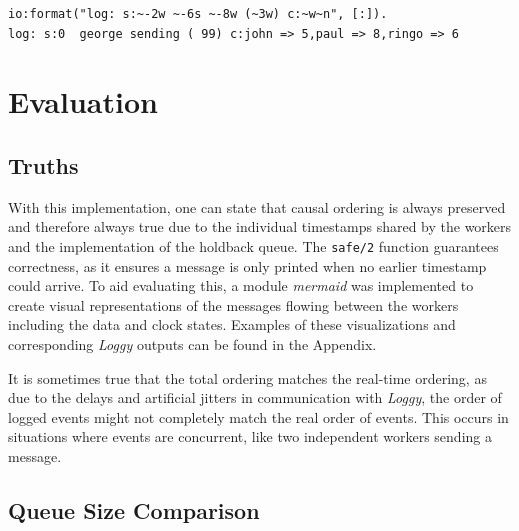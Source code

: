 \documentclass[a4paper, 11pt]{article}
\begin{document}
\begin{verbatim}
io:format("log: s:~-2w ~-6s ~-8w (~3w) c:~w~n", [:]).
log: s:0  george sending ( 99) c:john => 5,paul => 8,ringo => 6
\end{verbatim}

\section{Evaluation}


\subsection{Truths}

With this implementation, one can state that causal ordering is always preserved and therefore always true due to the individual timestamps shared by the workers and the implementation of the holdback queue.
The \texttt{safe/2} function guarantees correctness, as it ensures a message is only printed when no earlier timestamp could arrive. 
To aid evaluating this, a module \textit{mermaid} was implemented to create visual representations of the messages flowing between the workers including the data and clock states. Examples of these visualizations and corresponding \textit{Loggy} outputs can be found in the Appendix.

It is sometimes true that the total ordering matches the real-time ordering, as due to the delays and artificial jitters in communication with \textit{Loggy}, the order of logged events might not completely match the real order of events. This occurs in situations where events are concurrent, like two independent workers sending a message.

\subsection{Queue Size Comparison}
\end{document}
